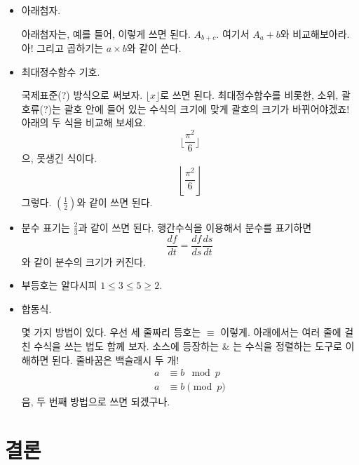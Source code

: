 \begin{itemize}
    \item 아래첨자.

아래첨자는, 예를 들어, 이렇게 쓰면 된다. $A_{b+c}$. 여기서 $A_a+b$와 비교해보아라. 아! 그리고 곱하기는 $a\times b$와 같이 쓴다.
\item 최대정수함수 기호. 

국제표준(?) 방식으로 써보자. $\lfloor x\rfloor$로 쓰면 된다. 최대정수함수를 비롯한, 소위, 괄호류(?)는 괄호 안에 들어 있는 수식의 크기에 맞게 괄호의 크기가 바뀌어야겠죠! 아래의 두 식을 비교해 보세요.
\[ \lfloor \frac{\pi^2}{6}\rfloor \]
으, 못생긴 식이다.
\[ \left\lfloor \frac{\pi^2}{6}\right\rfloor \]
그렇다. $\left( \frac{1}{2} \right)$와 같이 쓰면 된다.

\item 분수 표기는 $\frac{2}{3}$과 같이 쓰면 된다. 행간수식을 이용해서 분수를 표기하면 
\[ \frac{df}{dt}=\frac{df}{ds}\frac{ds}{dt} \]
와 같이 분수의 크기가 커진다.


\item 부등호는 알다시피 $1\leq 3\leq 5 \geq 2$.

\item 합동식.

몇 가지 방법이 있다. 우선 세 줄짜리 등호는 $\equiv$ 이렇게. 아래에서는 여러 줄에 걸친 수식을 쓰는 법도 함께 보자. 소스에 등장하는 \& 는 수식을 정렬하는 도구로 이해하면 된다. 줄바꿈은 백슬래시 두 개!
\begin{align*}
a & \equiv b \mod{p} \\
a & \equiv b \pmod{p}
\end{align*}
음, 두 번째 방법으로 쓰면 되겠구나.
\end{itemize}



\section{결론} 
\jiwon[4] %



